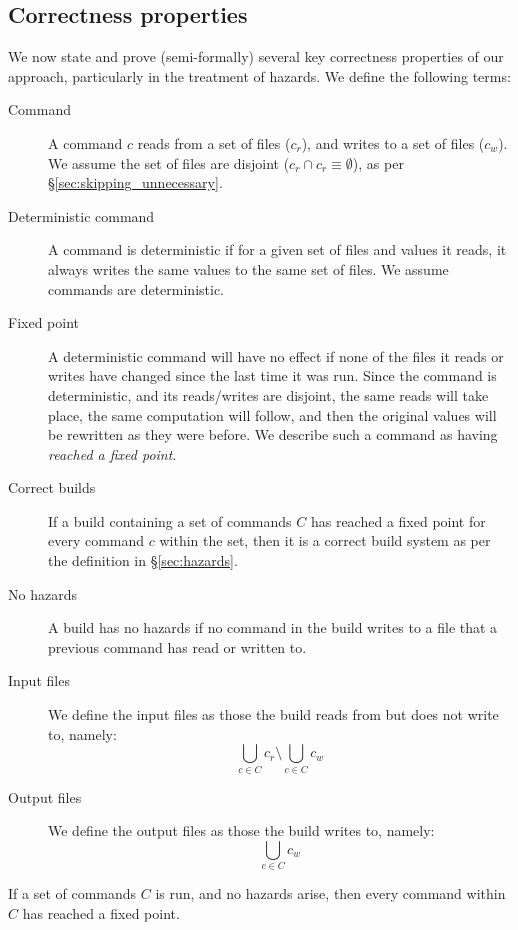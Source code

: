 \subsection{Correctness properties}
\label{sec:argument}
\label{sec:claims}

We now state and prove (semi-formally) several key correctness
properties of our approach, particularly in the treatment of hazards. We define the following terms:

\begin{description}
\item[Command] A command $c$ reads from a set of files ($c_r$), and writes to a set of files ($c_w$). We assume the set of files are disjoint ($c_r \cap c_r \equiv \emptyset$), as per \S\ref{sec:skipping_unnecessary}.
\item[Deterministic command] A command is deterministic if for a given set of files and values it reads, it always writes the same values to the same set of files. We assume commands are deterministic.
\item[Fixed point] A deterministic command will have no effect if none of the files it reads or writes have changed since the last time it was run. Since the command is deterministic, and its reads/writes are disjoint, the same reads will take place, the same computation will follow, and then the original values will be rewritten as they were before. We describe such a command as having \emph{reached a fixed point}.
\item[Correct builds] If a build containing a set of commands $C$ has reached a fixed point for every command $c$ within the set, then it is a correct build system as per the definition in \S\ref{sec:hazards}.
\item[No hazards] A build has no hazards if no command in the build writes to a file that a previous command has read or written to.
\item[Input files] We define the input files as those the build reads from but does not write to, namely:
\[
  \bigcup_{c \in C} c_r \setminus \bigcup_{c \in C} c_w
\]
\item[Output files] We define the output files as those the build writes to, namely:
\[
  \bigcup_{c \in C} c_w
\]
\end{description}

\begin{claim}[Completeness] If a set of commands $C$ is run, and no hazards arise, then every command within $C$ has reached a fixed point.
  \label{claim:complete}
\end{claim}


